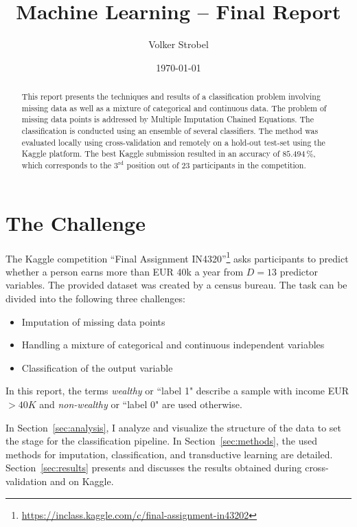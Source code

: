 \documentclass[a4paper]{article}
\begin{document}
\title{Machine Learning -- Final Report}

\author{Volker Strobel}

\date{\today}

\maketitle

\begin{abstract}
This report presents the techniques and results of a classification
  problem involving missing data as well as a mixture of categorical
  and continuous data. The problem of missing data points is
  addressed by Multiple Imputation Chained Equations. The
  classification is conducted using an ensemble of several classifiers. The
  method was evaluated locally using cross-validation and
  remotely on a hold-out test-set using the Kaggle platform. The best
  Kaggle submission resulted in an accuracy of $85.494\,\%$, which corresponds to
the $3^{\text{rd}}$ position out of $23$ participants in the competition.%
\end{abstract}%
\section{The Challenge}
\label{sec:introduction}

The Kaggle competition ``Final Assignment
IN4320''\footnote{\url{https://inclass.kaggle.com/c/final-assignment-in43202}}
asks participants to predict whether a person earns more than EUR 40k
a year from $D = 13$ predictor variables. The provided dataset was
created by a census bureau. The task can be divided into the following
three challenges:

\begin{itemize}
\item Imputation of missing data points
\item Handling a mixture of categorical and continuous independent variables
\item Classification of the output variable
\end{itemize}

In this report, the terms \emph{wealthy} or ``label 1" describe a sample with income EUR $>40K$ and \emph{non-wealthy} or ``label 0" are used otherwise.

In Section~\ref{sec:analysis}, I analyze and visualize
the structure of the data to set the stage for the classification pipeline. In
Section~\ref{sec:methods}, the used methods for imputation, classification, and transductive learning are detailed. Section~\ref{sec:results} presents and discusses the results obtained during cross-validation and on
Kaggle.
\end{document}
